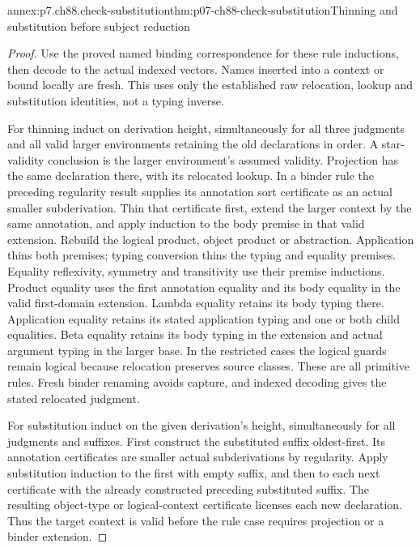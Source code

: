 \begin{annexitem}{annex:p7.ch88.check-substitution}{thm:p07-ch88-check-substitution}{Thinning and substitution before subject reduction}
\begin{proof}
Use the proved named binding correspondence for these rule inductions,
then decode to the actual indexed vectors. Names inserted into a
context or bound locally are fresh. This uses only the established
raw relocation, lookup and substitution identities, not a typing inverse.

For thinning induct on derivation height, simultaneously for all
three judgments and all valid larger environments retaining the
old declarations in order. A star-validity conclusion is the larger
environment's assumed validity. Projection has the same declaration
there, with its relocated lookup. In a binder rule the preceding
regularity result supplies its annotation sort certificate as an
actual smaller subderivation. Thin that certificate first, extend
the larger context by the same annotation, and apply induction to
the body premise in that valid extension. Rebuild the logical
product, object product or abstraction. Application thins both
premises; typing conversion thins the typing and equality premises.
Equality reflexivity, symmetry and transitivity use their premise
inductions. Product equality uses the first annotation equality
and its body equality in the valid first-domain extension. Lambda
equality retains its body typing there. Application equality retains
its stated application typing and one or both child equalities.
Beta equality retains its body typing in the extension and actual
argument typing in the larger base. In the restricted cases the
logical guards remain logical because relocation preserves source
classes. These are all primitive rules. Fresh binder renaming avoids
capture, and indexed decoding gives the stated relocated judgment.

For substitution induct on the given derivation's height, simultaneously
for all judgments and suffixes. First construct the substituted suffix
oldest-first. Its annotation certificates are smaller actual
subderivations by regularity. Apply substitution induction to the
first with empty suffix, and then to each next certificate with
the already constructed preceding substituted suffix. The resulting
object-type or logical-context certificate licenses each new
declaration. Thus the target context is valid before the rule case
requires projection or a binder extension.


\end{proof}
\end{annexitem}
